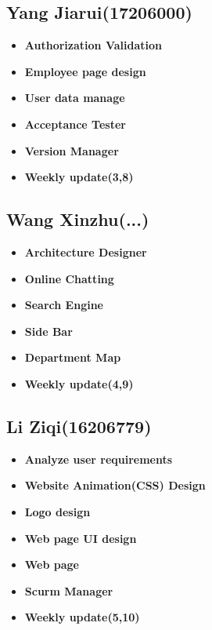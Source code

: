 \documentclass[a4paper]{article}
\begin{document}
\subsection{Yang Jiarui(17206000)}
\begin{itemize}
    \item \textbf{Authorization Validation}
     \item \textbf{Employee page design}
    \item \textbf{User data manage}
    \item \textbf{Acceptance Tester}
    \item \textbf{Version Manager}
    \item \textbf{Weekly update(3,8)}
\end{itemize}
\subsection{Wang Xinzhu(...)}
\begin{itemize}
    \item \textbf{Architecture Designer}
    \item \textbf{Online Chatting}
    \item \textbf{Search Engine}
    \item \textbf{Side Bar}
    \item \textbf{Department Map}
    \item \textbf{Weekly update(4,9)}
\end{itemize}
\subsection{Li Ziqi(16206779)}
\begin{itemize}
    \item \textbf{Analyze user requirements}  \newline
    \item \textbf{Website Animation(CSS) Design}
    \item \textbf{Logo design}
    \item \textbf{Web page UI design}
    \item \textbf{Web page}
    \item \textbf{Scurm Manager}
    \item \textbf{Weekly update(5,10)}

\end{itemize}
\end{document}
